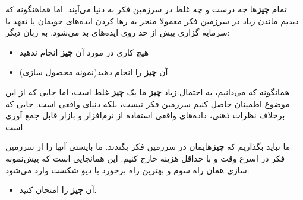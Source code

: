 تمام \textbf{چیز}ها چه درست و چه غلط در سرزمین فکر به دنیا می‌آیند. اما
هماهنگونه که دیدیم ماندن زیاد در سرزمین فکر معمولا منجر به رها کردن
ایده‌های خوبمان یا تعهد یا سرمایه گزاری بیش از حد روی ایده‌های بد
می‌شود. به زبان دیگر:

\begin{itemize}

\item
  هیچ کاری در مورد آن \textbf{چیز} انجام ندهید
\item
  آن \textbf{چیز} را انجام دهید(نمونه محصول سازی)
\end{itemize}

همانگونه که می‌دانیم، به احتمال زیاد \textbf{چیز} ما یک \textbf{چیز} غلط
است، اما جایی که از این موضوع اطمینان حاصل کنیم سرزمین فکر نیست، بلکه
دنیای واقعی است. جایی که برخلاف نظرات ذهنی، داده‌های واقعی استفاده از
نرم‌افزار و بازار قابل جمع آوری است.

ما نباید بگذاریم که \textbf{چیز}هایمان در سرزمین فکر بگندند. ما بایستی
آنها را از سرزمین فکر در اسرع وقت و با حداقل هزینه خارج کنیم. این
همانجایی است که پیش‌نمونه سازی همان راه سوم و بهترین راه برخورد با دیو
شکست وارد می‌شود:

\begin{itemize}

\item
  آن \textbf{چیز} را امتحان کنید.
\end{itemize}
